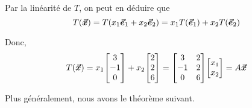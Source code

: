 \documentclass{article}
\begin{document}
{{        Par la linéarité de $T$, on peut en déduire que
        \[T\left(\bvec{x}\right) = T\left(x_1 \bvec{e}_1 + x_2 \bvec{e}_2\right)= x_1 T\left(\bvec{e}_1\right) + x_2 T\left(\bvec{e}_2\right)\]

        Donc,
        \[T\left(\bvec{x}\right) = x_1 \begin{bmatrix} 3 \\ -1 \\ 0 \end{bmatrix} + x_2 \begin{bmatrix} 2 \\ 2 \\ 6 \end{bmatrix} = \begin{bmatrix} 3 & 2 \\ -1 & 2 \\ 0 & 6 \end{bmatrix} \begin{bmatrix} x_1 \\ x_2 \end{bmatrix} = A \bvec{x}\]
    }

    Plus généralement, nous avons le théorème suivant.
}
\end{document}
